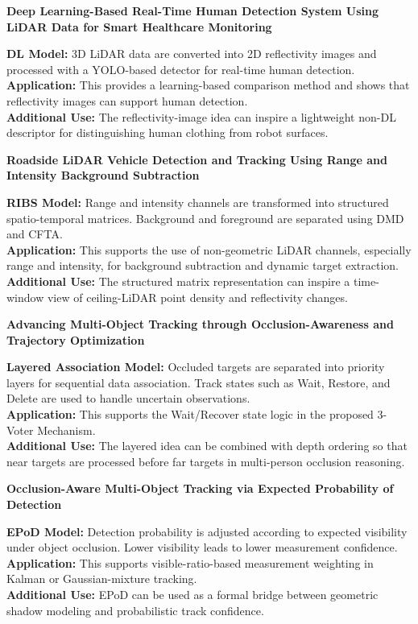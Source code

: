 \documentclass[11pt,a4paper]{report}
\newcommand{\boxitemtitle}[1]{
    \vspace{0.5em}
    {\large\textbf{\color{DeepBlue} #1}}\par
    \vspace{0.8em}
}
\begin{document}
\boxitemtitle{Deep Learning-Based Real-Time Human Detection System Using LiDAR Data for Smart Healthcare Monitoring~\cite{kalashtari2024deeplidar}}
\begin{contentbox}
    \textbf{DL Model:} 3D LiDAR data are converted into 2D reflectivity images and processed with a YOLO-based detector for real-time human detection. \\
    \textbf{Application:} This provides a learning-based comparison method and shows that reflectivity images can support human detection. \\
    \textbf{Additional Use:} The reflectivity-image idea can inspire a lightweight non-DL descriptor for distinguishing human clothing from robot surfaces.
\end{contentbox}

\boxitemtitle{Roadside LiDAR Vehicle Detection and Tracking Using Range and Intensity Background Subtraction~\cite{zhang2022roadside}}
\begin{contentbox}
    \textbf{RIBS Model:} Range and intensity channels are transformed into structured spatio-temporal matrices. Background and foreground are separated using DMD and CFTA. \\
    \textbf{Application:} This supports the use of non-geometric LiDAR channels, especially range and intensity, for background subtraction and dynamic target extraction. \\
    \textbf{Additional Use:} The structured matrix representation can inspire a time-window view of ceiling-LiDAR point density and reflectivity changes.
\end{contentbox}

\boxitemtitle{Advancing Multi-Object Tracking through Occlusion-Awareness and Trajectory Optimization~\cite{advancingMOT2024}}
\begin{contentbox}
    \textbf{Layered Association Model:} Occluded targets are separated into priority layers for sequential data association. Track states such as Wait, Restore, and Delete are used to handle uncertain observations. \\
    \textbf{Application:} This supports the Wait/Recover state logic in the proposed 3-Voter Mechanism. \\
    \textbf{Additional Use:} The layered idea can be combined with depth ordering so that near targets are processed before far targets in multi-person occlusion reasoning.
\end{contentbox}

\boxitemtitle{Occlusion-Aware Multi-Object Tracking via Expected Probability of Detection~\cite{epodMOT2024}}
\begin{contentbox}
    \textbf{EPoD Model:} Detection probability is adjusted according to expected visibility under object occlusion. Lower visibility leads to lower measurement confidence. \\
    \textbf{Application:} This supports visible-ratio-based measurement weighting in Kalman or Gaussian-mixture tracking. \\
    \textbf{Additional Use:} EPoD can be used as a formal bridge between geometric shadow modeling and probabilistic track confidence.
\end{contentbox}
\end{document}
